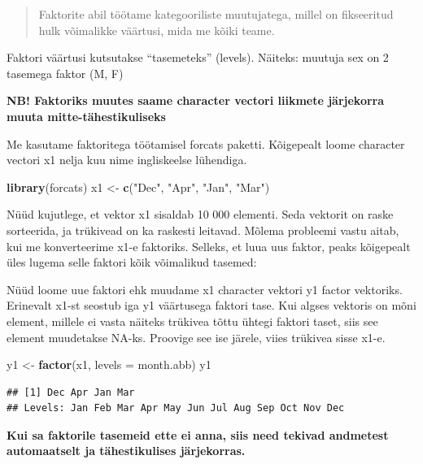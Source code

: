 \documentclass[]{book}
\newenvironment{Shaded}{\begin{snugshade}}{\end{snugshade}}
\newcommand{\KeywordTok}[1]{\textcolor[rgb]{0.13,0.29,0.53}{\textbf{#1}}}
\newcommand{\DataTypeTok}[1]{\textcolor[rgb]{0.13,0.29,0.53}{#1}}
\newcommand{\StringTok}[1]{\textcolor[rgb]{0.31,0.60,0.02}{#1}}
\newcommand{\NormalTok}[1]{#1}
\begin{document}
\begin{quote}
Faktorite abil töötame kategooriliste muutujatega, millel on fikseeritud
hulk võimalikke väärtusi, mida me kõiki teame.
\end{quote}

Faktori väärtusi kutsutakse ``tasemeteks'' (levels). Näiteks: muutuja
sex on 2 tasemega faktor (M, F)

\textbf{NB! Faktoriks muutes saame character vectori liikmete järjekorra
muuta mitte-tähestikuliseks}

Me kasutame faktoritega töötamisel forcats paketti. Kõigepealt loome
character vectori x1 nelja kuu nime ingliskeelse lühendiga.

\begin{Shaded}
\begin{Highlighting}[]
\KeywordTok{library}\NormalTok{(forcats)}
\NormalTok{x1 <-}\StringTok{ }\KeywordTok{c}\NormalTok{(}\StringTok{"Dec"}\NormalTok{, }\StringTok{"Apr"}\NormalTok{, }\StringTok{"Jan"}\NormalTok{, }\StringTok{"Mar"}\NormalTok{)}
\end{Highlighting}
\end{Shaded}

Nüüd kujutlege, et vektor x1 sisaldab 10 000 elementi. Seda vektorit on
raske sorteerida, ja trükivead on ka raskesti leitavad. Mõlema probleemi
vastu aitab, kui me konverteerime x1-e faktoriks. Selleks, et luua uus
faktor, peaks kõigepealt üles lugema selle faktori kõik võimalikud
tasemed:

Nüüd loome uue faktori ehk muudame x1 character vektori y1 factor
vektoriks. Erinevalt x1-st seostub iga y1 väärtusega faktori tase. Kui
algses vektoris on mõni element, millele ei vasta näiteks trükivea tõttu
ühtegi faktori taset, siis see element muudetakse NA-ks. Proovige see
ise järele, viies trükivea sisse x1-e.

\begin{Shaded}
\begin{Highlighting}[]
\NormalTok{y1 <-}\StringTok{ }\KeywordTok{factor}\NormalTok{(x1, }\DataTypeTok{levels =}\NormalTok{ month.abb)}
\NormalTok{y1}
\end{Highlighting}
\end{Shaded}

\begin{verbatim}
## [1] Dec Apr Jan Mar
## Levels: Jan Feb Mar Apr May Jun Jul Aug Sep Oct Nov Dec
\end{verbatim}

\textbf{Kui sa faktorile tasemeid ette ei anna, siis need tekivad
andmetest automaatselt ja tähestikulises järjekorras.}
\end{document}
